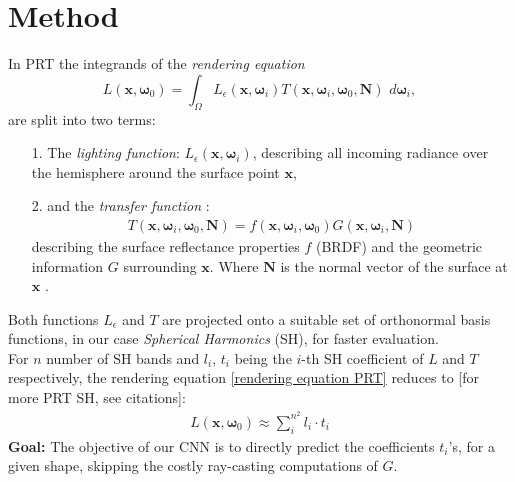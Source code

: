 \section{Method}
In PRT the integrands of the \textit{rendering equation}
\begin{equation}
L(\bm{x}, \bm{\omega}_0 ) = 
\int_{\Omega} L_{\epsilon}(\bm{x}, \bm{\omega}_i ) 
T(\bm{x},\bm{\omega}_i,\bm{\omega}_0, \bm{N}) 
\,  \, d\bm{\omega}_i ,
\label{rendering equation PRT}
\end{equation}
 are split into two terms:
\begin{itemize}
\item[1.] The \textit{lighting function}: $L_{\epsilon}(\bm{x}, \bm{\omega}_i ) $, describing all incoming radiance over the hemisphere around the surface point $\bm{x} $,
\item[2.] and the \textit{transfer function} :  
\begin{align*}
T(\bm{x},\bm{\omega}_i,\bm{\omega}_0, \bm{N}) = f(\bm{x},\bm{\omega}_i,\bm{\omega}_0) G(\bm{x},\bm{\omega}_i,\bm{N}) 
\end{align*}
describing the surface reflectance properties $f$ (BRDF) and the geometric information $G$ surrounding $\bm{x}$. 
Where $\bm{N}$ is the normal vector of the surface at $\bm{x}$ .
\end{itemize}
Both functions $L_{\epsilon} $ and $T$ are projected onto a suitable set of orthonormal basis functions, in our case \textit{Spherical Harmonics} (SH), for faster evaluation.\\
For $n$ number of SH bands and $l_i$, $t_i$ being the $i$-th SH coefficient of $L$ and $T$ respectively, the rendering equation \ref{rendering equation PRT} reduces to  [for more PRT SH, see citations]: 
\begin{align*}
L(\bm{x}, \bm{\omega}_0 ) \approx \sum_{i}^{n^2} l_i \cdot t_i
\end{align*}
\textbf{Goal:} The objective of our CNN is to directly predict the coefficients $t_i$'s, for a given shape, skipping the costly ray-casting computations of $G$. 
